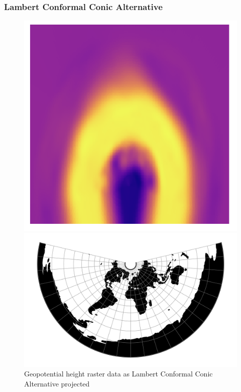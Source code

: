 \subsubsection*{Lambert Conformal Conic Alternative}
\begin{figure}[h]
    \centering
    \begin{minipage}{0.30\textwidth}
        \centering
        \includegraphics[width=0.9\linewidth]{figures/chapter-8/geopoth_lcca.png}
        \caption{ Geopotential height raster data as Lambert Conformal Conic Alternative projected}
        \label{fig:lcca_geopoth_raster}
    \end{minipage}\hfill
    \begin{minipage}{0.30\textwidth}
        \centering
        \includegraphics[width=0.9\linewidth]{figures/chapter-8/lcca.png}

\end{minipage}
\end{figure}
